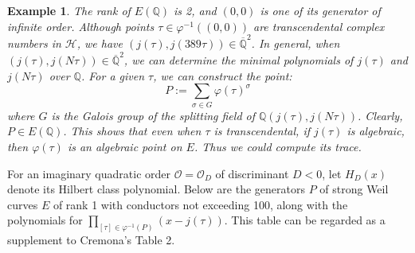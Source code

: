 \documentclass[10pt, a4paper]{article}
\newtheorem{example}[theorem]{Example}
\begin{document}
\begin{example}
 The rank of $E(\mathbb{Q})$ is 2, and $(0,0)$ is one of its generator of infinite order. Although points $\tau \in \varphi^{-1}((0,0))$ are transcendental complex numbers in $\mathcal{H}$, we have $(j(\tau), j(389\tau)) \in \overline{\mathbb{Q}}^2$. In general, when $(j(\tau), j(N\tau)) \in \overline{\mathbb{Q}}^2$, we can determine the minimal polynomials of $j(\tau)$ and $j(N\tau)$ over $\mathbb{Q}$.  For a given $\tau$, we can construct the point:
\[
P := \sum_{\sigma \in G} \varphi(\tau)^\sigma
\]
where $G$ is the Galois group of the splitting field of $\mathbb{Q}(j(\tau), j(N\tau))$. Clearly, $P \in E(\mathbb{Q})$. This shows that even when $\tau$ is transcendental, if $j(\tau)$ is algebraic, then $\varphi(\tau)$ is an algebraic point on $E$. Thus we could compute its trace.
\end{example}
For an imaginary quadratic order  $\mathcal{O} = {\mathcal{O}_D}$ of discriminant $D < 0$,  let $H_D(x)$  denote its Hilbert class polynomial.  Below are the generators  $P$  of strong Weil curves  $E$ of rank 1 with conductors not exceeding 100, along with the polynomials  for
$\prod\limits_{[\tau]  \in {\varphi ^{ - 1}}(P)} {(x - j(\tau ))} $.  This table can be regarded as a supplement to Cremona's Table 2.
\end{document}
